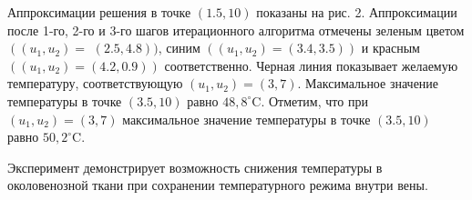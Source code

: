 Аппроксимации решения в точке $(1.5,10)$ показаны на рис. 2.
Аппроксимации после 1-го, 2-го и 3-го шагов итерационного алгоритма отмечены зеленым
цветом
$\left(\left(u_{1 }, u_{2}\right)=\right.$ $(2.5,4.8))$,
синим  $\left(\left(u_{1}, u_{2}\right)=(3.4,3.5)\right)$
и красным $\left(\left(u_{1}, u_{2}\right)=(4.2,0.9)\right)$ соответственно.
Черная линия показывает желаемую температуру, соответствующую
$\left(u_{1}, u_{2}\right)=(3,7)$.
Максимальное значение температуры в точке $(3.5,10)$ равно $48,8^{\circ}\mathrm{C}$.
Отметим, что при $\left(u_{1}, u_{2}\right)=(3,7)$ максимальное значение
температуры в точке $(3.5,10)$ равно $50,2^{ \circ} \mathrm{C}$.

Эксперимент демонстрирует возможность снижения температуры в
околовенозной ткани при сохранении температурного режима внутри вены.
